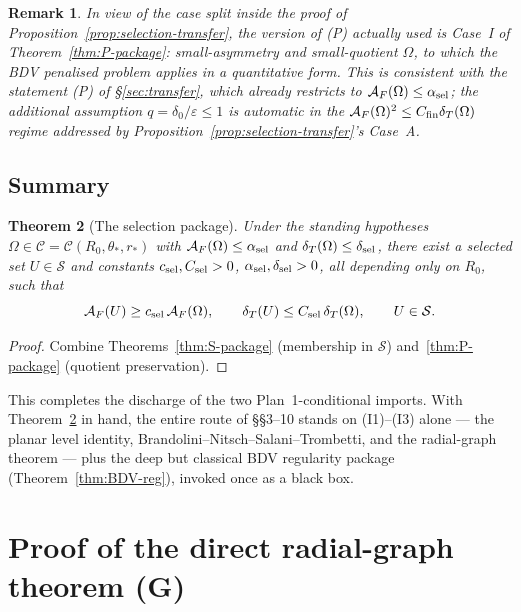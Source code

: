 \documentclass[11pt]{amsart}
\newtheorem{theorem}{Theorem}[section]
\newtheorem{remark}[theorem]{Remark}
\newcommand{\dT}{\delta_T}
\newcommand{\AF}{\mathcal A_F}
\newcommand{\Sclass}{\mathcal S}
\begin{document}
\begin{remark}\label{rem:P-restriction}
In view of the case split inside the proof of
Proposition~\ref{prop:selection-transfer}, the version of (P) actually
used is Case~I of Theorem~\ref{thm:P-package}: small-asymmetry and
small-quotient \(\Omega\), to which the BDV penalised problem applies
in a quantitative form.  This is consistent with the statement (P) of
\S\ref{sec:transfer}, which already restricts to
\(\AF(\Omega)\le\alpha_{\rm sel}\); the additional assumption
\(q=\delta_0/\varepsilon\le 1\) is automatic in the
\(\AF(\Omega)^{2}\le C_{\rm fin}\dT(\Omega)\) regime addressed by
Proposition~\ref{prop:selection-transfer}'s Case~A.
\end{remark}

\subsection{Summary}\label{ss:summary-S11}

\begin{theorem}[The selection package]\label{thm:selection-package}
Under the standing hypotheses
\(\Omega\in\mathcal C=\mathcal C(R_0,\theta_*,r_*)\) with
\(\AF(\Omega)\le\alpha_{\rm sel}\) and
\(\dT(\Omega)\le\delta_{\rm sel}\), there exist a selected set
\(U\in\Sclass\) and constants
\(c_{\rm sel},C_{\rm sel}>0\), \(\alpha_{\rm sel},\delta_{\rm sel}>0\),
all depending only on \(R_0\), such that
\[
   \AF(U)\ge c_{\rm sel}\,\AF(\Omega),
   \qquad
   \dT(U)\le C_{\rm sel}\,\dT(\Omega),
   \qquad
   U\in\Sclass.
\]
\end{theorem}

\begin{proof}
Combine Theorems~\ref{thm:S-package} (membership in \(\Sclass\))
and~\ref{thm:P-package} (quotient preservation).
\end{proof}

This completes the discharge of the two Plan~1-conditional imports.
With Theorem~\ref{thm:selection-package} in hand, the entire route of
\S\S3--10 stands on (I1)--(I3) alone --- the planar level identity,
Brandolini--Nitsch--Salani--Trombetti, and the radial-graph theorem ---
plus the deep but classical BDV regularity package
(Theorem~\ref{thm:BDV-reg}), invoked once as a black box.

\section{Proof of the direct radial-graph theorem (G)}
\label{sec:graph-proof}
\end{document}
